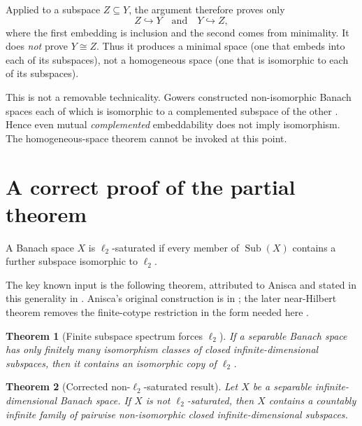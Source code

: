 \documentclass[11pt]{article}
\newtheorem{theorem}{Theorem}[section]
\theoremstyle{definition}
\theoremstyle{remark}
\newcommand{\ellTwo}{\ell_2}
\newcommand{\Sub}{\operatorname{Sub}}
\newcommand{\iso}{\cong}
\newcommand{\embeds}{\hookrightarrow}
\begin{document}
Applied to a subspace \(Z\subseteq Y\), the argument therefore proves only
\[
  Z\embeds Y
  \quad\text{and}\quad
  Y\embeds Z,
\]
where the first embedding is inclusion and the second comes from minimality.  It does \emph{not} prove \(Y\iso Z\).  Thus it produces a minimal space (one that embeds into each of its subspaces), not a homogeneous space (one that is isomorphic to each of its subspaces).

This is not a removable technicality.  Gowers constructed non-isomorphic Banach spaces each of which is isomorphic to a complemented subspace of the other \cite{GowersSB}.  Hence even mutual \emph{complemented} embeddability does not imply isomorphism.  The homogeneous-space theorem cannot be invoked at this point.

\begin{center}
\end{center}

\section{A correct proof of the partial theorem}

A Banach space \(X\) is \(\ellTwo\)-saturated if every member of \(\Sub(X)\) contains a further subspace isomorphic to \(\ellTwo\).

The key known input is the following theorem, attributed to Anisca and stated in this generality in \cite[Theorem 6.6]{CCRF2023}.  Anisca's original construction is in \cite{Anisca2007}; the later near-Hilbert theorem removes the finite-cotype restriction in the form needed here \cite{Cuellar2018}.

\begin{theorem}[Finite subspace spectrum forces \(\ellTwo\)]\label{thm:anisca}
If a separable Banach space has only finitely many isomorphism classes of closed infinite-dimensional subspaces, then it contains an isomorphic copy of \(\ellTwo\).
\end{theorem}

\begin{theorem}[Corrected non-\(\ellTwo\)-saturated result]\label{thm:corrected}
Let \(X\) be a separable infinite-dimensional Banach space.  If \(X\) is not \(\ellTwo\)-saturated, then \(X\) contains a countably infinite family of pairwise non-isomorphic closed infinite-dimensional subspaces.
\end{theorem}
\end{document}
